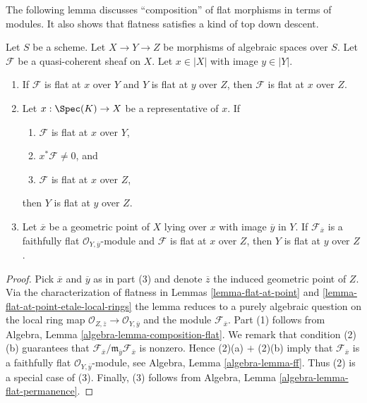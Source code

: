 \noindent
The following lemma discusses ``composition'' of flat morphisms in
terms of modules. It also shows that flatness satisfies a kind of
top down descent.

\begin{lemma}
\label{lemma-composition-module-flat}
Let $S$ be a scheme. Let $X \to Y \to Z$ be morphisms of algebraic spaces
over $S$. Let $\mathcal{F}$ be a quasi-coherent sheaf on $X$.
Let $x \in |X|$ with image $y \in |Y|$.
\begin{enumerate}
\item If $\mathcal{F}$ is flat at $x$ over $Y$ and
$Y$ is flat at $y$ over $Z$, then $\mathcal{F}$ is flat at
$x$ over $Z$.
\item Let $x : \Spec(K) \to X$ be a representative of $x$. If
\begin{enumerate}
\item $\mathcal{F}$ is flat at $x$ over $Y$,
\item $x^*\mathcal{F} \not = 0$, and
\item $\mathcal{F}$ is flat at $x$ over $Z$,
\end{enumerate}
then $Y$ is flat at $y$ over $Z$.
\item Let $\overline{x}$ be a geometric point of $X$ lying over $x$
with image $\overline{y}$ in $Y$. If $\mathcal{F}_{\overline{x}}$ is a
faithfully flat $\mathcal{O}_{Y, \overline{y}}$-module and
$\mathcal{F}$ is flat at $x$ over $Z$, then
$Y$ is flat at $y$ over $Z$.
\end{enumerate}
\end{lemma}

\begin{proof}
Pick $\overline{x}$ and $\overline{y}$ as in part (3) and denote
$\overline{z}$ the induced geometric point of $Z$. Via the
characterization of flatness in
Lemmas \ref{lemma-flat-at-point} and
\ref{lemma-flat-at-point-etale-local-rings}
the lemma reduces to a purely algebraic question on the local
ring map $\mathcal{O}_{Z, \overline{z}} \to \mathcal{O}_{Y, \overline{y}}$
and the module $\mathcal{F}_{\overline{x}}$.
Part (1) follows from
Algebra, Lemma \ref{algebra-lemma-composition-flat}.
We remark that condition (2)(b) guarantees that
$\mathcal{F}_{\overline{x}}/
\mathfrak m_{\overline{y}} \mathcal{F}_{\overline{x}}$
is nonzero. Hence (2)(a) $+$ (2)(b) imply that $\mathcal{F}_{\overline{x}}$
is a faithfully flat $\mathcal{O}_{Y, \overline{y}}$-module, see
Algebra, Lemma \ref{algebra-lemma-ff}.
Thus (2) is a special case of (3).
Finally, (3) follows from
Algebra, Lemma \ref{algebra-lemma-flat-permanence}.
\end{proof}


